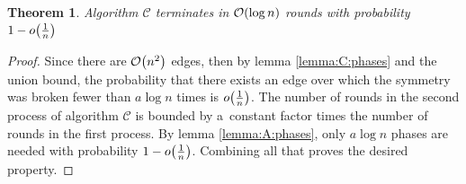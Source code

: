 \documentclass{article}
\newtheorem{theorem}{Theorem}
\DeclarePairedDelimiter{\parenthesesdelimiter}{(}{)}
\def\pars{\parenthesesdelimiter*}
\newcommand{\bigO}{\mathcal{O}}
\begin{document}
\begin{theorem}
\label{theorem:C}
Algorithm \(\mathcal{C}\) terminates in \(\bigO\pars{\log n}\) rounds with probability \(1 - o\pars{\frac{1}{n}}\)
\end{theorem}
\begin{proof}
Since there are \(\bigO\pars{n^2}\) edges, then by lemma \ref{lemma:C:phases} and the union bound, the probability that there exists an edge over which the symmetry was broken fewer than \(a\log n\) times is \(o\pars{\frac{1}{n}}\). The number of rounds in the second process of algorithm \(\mathcal{C}\) is bounded by a~constant factor times the number of rounds in the first process. By lemma \ref{lemma:A:phases}, only \(a\log n\) phases are needed with probability \(1 - o\pars{\frac{1}{n}}\). Combining all that proves the desired property.
\end{proof}
\end{document}
